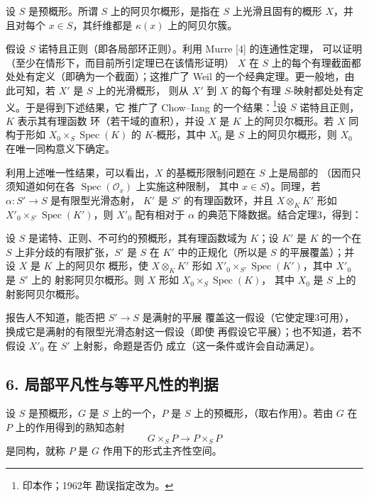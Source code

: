 设 $S$ 是预概形。所谓 $S$ 上的阿贝尔概形，是指在 $S$ 上光滑且固有的概形
$X$，并且对每个 $x\in S$，其纤维都是 $\kappa(x)$ 上的阿贝尔簇。

假设 $S$ 诺特且正则（即各局部环正则）。利用 Murre [4] 的连通性定理，
可以证明（至少在情形下，而目前所引定理已在该情形证明）
$X$ 在 $S$ 上的每个有理截面都处处有定义（即确为一个截面）；这推广了
Weil 的一个经典定理。更一般地，由此可知，若 $X'$ 是 $S$ 上的光滑概形，
则从 $X'$ 到 $X$ 的每个有理 $S$-映射都处处有定义。于是得到下述结果，它
推广了 Chow--Iang 的一个结果：\footnote{印本作；1962年
勘误指定改为。}设 $S$ 诺特且正则，$K$ 表示其有理函数
环（若干域的直积），并设 $X$ 是 $K$ 上的阿贝尔概形。若 $X$ 同构于形如
$X_0\times_S\operatorname{Spec}(K)$ 的 $K$-概形，其中 $X_0$ 是 $S$
上的阿贝尔概形，则 $X_0$ 在唯一同构意义下确定。

利用上述唯一性结果，可以看出，$X$ 的基概形限制问题在 $S$ 上是局部的
（因而只须知道如何在各 $\operatorname{Spec}(\mathcal O_x)$ 上实施这种限制，
其中 $x\in S$）。同理，若 $\alpha:S'\longrightarrow S$ 是有限型光滑态射，
$K'$ 是 $S'$ 的有理函数环，并且 $X\otimes_KK'$ 形如
$X'_0\times_{S'}\operatorname{Spec}(K')$，则 $X'_0$ 配有相对于
$\alpha$ 的典范下降数据。结合定理3，得到：

 设 $S$ 是诺特、正则、不可约的预概形，其有理函数域为
$K$；设 $K'$ 是 $K$ 的一个在 $S$ 上非分歧的有限扩张，$S'$ 是 $S$ 在
$K'$ 中的正规化（所以是 $S$ 的平展覆盖）；并设 $X$ 是 $K$ 上的阿贝尔
概形，使 $X\otimes_KK'$ 形如
$X'_0\times_{S'}\operatorname{Spec}(K')$，其中 $X'_0$ 是 $S'$ 上的
射影阿贝尔概形。则 $X$ 形如 $X_0\times_S\operatorname{Spec}(K)$，
其中 $X_0$ 是 $S$ 上的射影阿贝尔概形。

 报告人不知道，能否把 $S'\longrightarrow S$ 是满射的平展
覆盖这一假设（它使定理3可用），换成它是满射的有限型光滑态射这一假设（即使
再假设它平展）；也不知道，若不假设 $X'_0$ 在 $S'$ 上射影，命题是否仍
成立（这一条件或许会自动满足）。

\subsection*{6. 局部平凡性与等平凡性的判据}

设 $S$ 是预概形，$G$ 是 $S$ 上的一个，$P$ 是
$S$ 上的预概形，（取右作用）。若由 $G$ 在 $P$
上的作用得到的熟知态射
\[
  G\times_SP\longrightarrow P\times_SP
\]
是同构，就称 $P$ 是 $G$ 作用下的形式主齐性空间。

